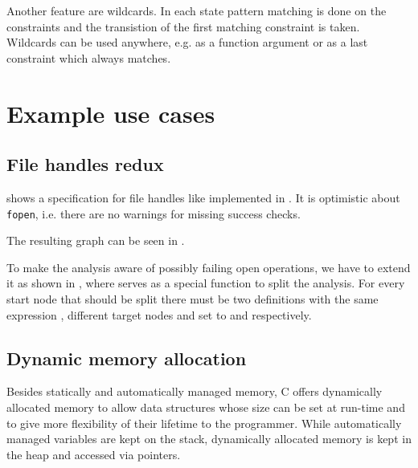 Another feature are wildcards. In each state pattern matching is done on the constraints and the transistion of the first matching constraint is taken. Wildcards can be used anywhere, e.g. as a function argument or as a last constraint which always matches.



\chapter{Example use cases}

\section{File handles redux}
 shows a specification for file handles like implemented in . It is optimistic about \verb|fopen|, i.e. there are no warnings for missing success checks.

The resulting graph can be seen in . %

\begin{landscape}
\end{landscape}

To make the analysis aware of possibly failing open operations, we have to extend it as shown in , where  serves as a special function to split the analysis.
For every start node that should be split there must be two definitions with the same expression , different target nodes and  set to  and  respectively.


\section{Dynamic memory allocation}
Besides statically and automatically managed memory, C offers dynamically allocated memory to allow data structures whose size can be set at run-time and to give more flexibility of their lifetime to the programmer. While automatically managed variables are kept on the stack, dynamically allocated memory is kept in the heap and accessed via pointers.

